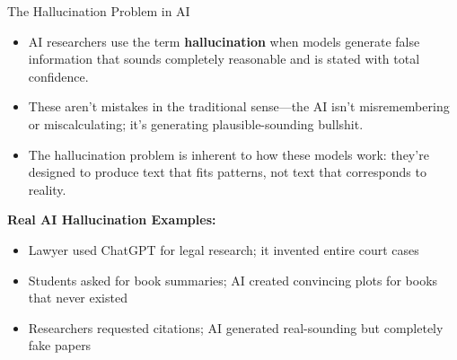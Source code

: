 \documentclass{beamer}
\begin{document}
	\begin{frame}{The Hallucination Problem in AI}
		\begin{itemize}
			\item AI researchers use the term \textbf{hallucination} when models generate false information that sounds completely reasonable and is stated with total confidence.
			\item These aren't mistakes in the traditional sense—the AI isn't misremembering or miscalculating; it's generating plausible-sounding bullshit.
			\item The hallucination problem is inherent to how these models work: they're designed to produce text that fits patterns, not text that corresponds to reality.
		\end{itemize}
		
		\begin{example}
			\scriptsize
			\textbf{Real AI Hallucination Examples:}
			\begin{itemize}
				\item Lawyer used ChatGPT for legal research; it invented entire court cases
				\item Students asked for book summaries; AI created convincing plots for books that never existed
				\item Researchers requested citations; AI generated real-sounding but completely fake papers
			\end{itemize}
		\end{example}
	\end{frame}
	
\end{document}
